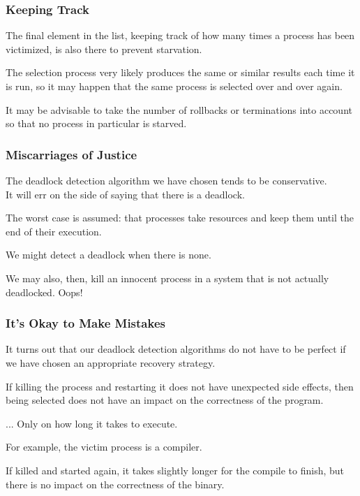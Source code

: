 \begin{frame}
\frametitle{Keeping Track}

The final element in the list, keeping track of how many times a process has been victimized, is also there to prevent starvation. 

The selection process very likely produces the same or similar results each time it is run, so it may happen that the same process is selected over and over again. 

It may be advisable to take the number of rollbacks or terminations into account so that no process in particular is starved.

\end{frame}

\begin{frame}
\frametitle{Miscarriages of Justice}

The deadlock detection algorithm we have chosen tends to be conservative.\\
\quad It will err on the side of saying that there is a deadlock. 

The worst case is assumed: that processes take resources and keep them until the end of their execution. 

We might detect a deadlock when there is none. 

We may also, then, kill an innocent process in a system that is not actually deadlocked. Oops!

\end{frame}

\begin{frame}
\frametitle{It's Okay to Make Mistakes}

It turns out that our deadlock detection algorithms do not have to be perfect if we have chosen an appropriate recovery strategy. 

If killing the process and restarting it does not have unexpected side effects, then being selected does not have an impact on the correctness of the program. 

... Only on how long it takes to execute. 

For example, the victim process is a compiler. 

If killed and started again, it takes slightly longer for the compile to finish, but there is no impact on the correctness of the binary.


\end{frame}




